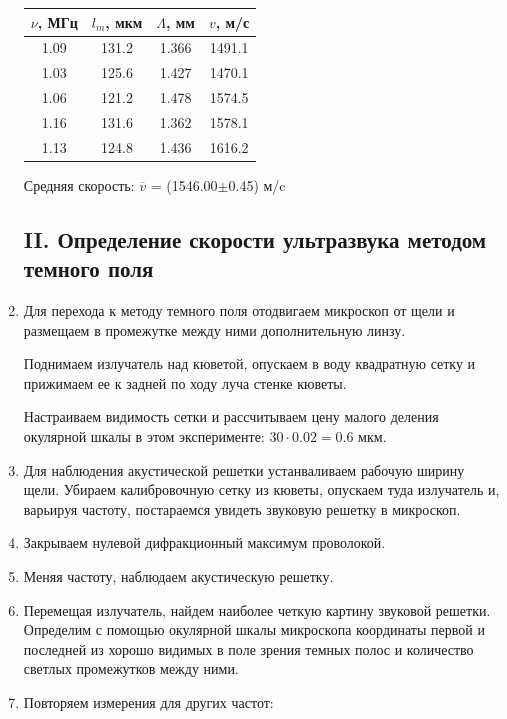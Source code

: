 \documentclass[a4paper,12pt]{article}
\begin{document}
\begin{enumerate}
    \begin{table}[h!]
    \centering
    \begin{tabular}{||c|c|c|c||}
    \hline
        $\nu$, МГц & $l_m$, мкм & $\Lambda$, мм & $v$, м/с \\
        \hline
        1.09 & 131.2 & 1.366 & 1491.1 \\ 
        1.03 & 125.6 & 1.427 & 1470.1 \\
        1.06 & 121.2 & 1.478 & 1574.5 \\
        1.16 & 131.6 & 1.362 & 1578.1 \\
        1.13 & 124.8 & 1.436 & 1616.2 \\
        \hline
    \end{tabular}
    \end{table}

    Средняя скорость: $\overline{v}$ = (1546.00$\pm$0.45) м/c

    \subsection{II. Определение скорости ультразвука методом темного поля}

    \item Для перехода к методу темного поля отодвигаем микроскоп от щели и размещаем в промежутке между ними дополнительную линзу.

    Поднимаем излучатель над кюветой, опускаем в воду квадратную сетку и прижимаем ее к задней по ходу луча стенке кюветы.

    Настраиваем видимость сетки и рассчитываем цену малого деления окулярной шкалы в этом эксперименте:  $30 \cdot 0.02 = 0.6$ мкм.
    \item Для наблюдения акустической решетки устанваливаем рабочую ширину щели. Убираем калибровочную сетку из кюветы, опускаем туда излучатель и, варьируя частоту, постараемся увидеть звуковую решетку в микроскоп. 
    \item Закрываем нулевой дифракционный максимум проволокой.
    \item Меняя частоту, наблюдаем акустическую решетку.
    \item Перемещая излучатель, найдем наиболее четкую картину звуковой решетки. Определим с помощью окулярной шкалы микроскопа координаты первой и последней из хорошо видимых в поле зрения темных полос и количество светлых промежутков между ними.
    \item Повторяем измерения для других частот:


\end{enumerate}
\end{document}
